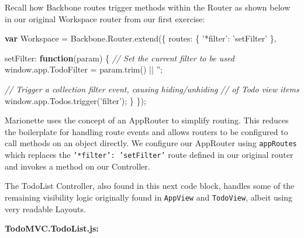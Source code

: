 \documentclass[9pt]{book}
\newenvironment{Shaded}{}{}
\newcommand{\KeywordTok}[1]{\textcolor[rgb]{0.00,0.44,0.13}{\textbf{{#1}}}}
\newcommand{\DataTypeTok}[1]{\textcolor[rgb]{0.56,0.13,0.00}{{#1}}}
\newcommand{\StringTok}[1]{\textcolor[rgb]{0.25,0.44,0.63}{{#1}}}
\newcommand{\CommentTok}[1]{\textcolor[rgb]{0.38,0.63,0.69}{\textit{{#1}}}}
\newcommand{\OtherTok}[1]{\textcolor[rgb]{0.00,0.44,0.13}{{#1}}}
\newcommand{\FunctionTok}[1]{\textcolor[rgb]{0.02,0.16,0.49}{{#1}}}
\newcommand{\NormalTok}[1]{{#1}}
\begin{document}
Recall how Backbone routes trigger methods within the Router as shown
below in our original Workspace router from our first exercise:

\begin{Shaded}
\begin{Highlighting}[]
  \KeywordTok{var} \NormalTok{Workspace = }\OtherTok{Backbone}\NormalTok{.}\OtherTok{Router}\NormalTok{.}\FunctionTok{extend}\NormalTok{(\{}
    \DataTypeTok{routes}\NormalTok{: \{}
      \StringTok{'*filter'}\NormalTok{: }\StringTok{'setFilter'}
    \NormalTok{\},}

    \DataTypeTok{setFilter}\NormalTok{: }\KeywordTok{function}\NormalTok{(param) \{}
      \CommentTok{// Set the current filter to be used}
      \OtherTok{window}\NormalTok{.}\OtherTok{app}\NormalTok{.}\FunctionTok{TodoFilter} \NormalTok{= }\OtherTok{param}\NormalTok{.}\FunctionTok{trim}\NormalTok{() || }\StringTok{''}\NormalTok{;}

      \CommentTok{// Trigger a collection filter event, causing hiding/unhiding}
      \CommentTok{// of Todo view items}
      \OtherTok{window}\NormalTok{.}\OtherTok{app}\NormalTok{.}\OtherTok{Todos}\NormalTok{.}\FunctionTok{trigger}\NormalTok{(}\StringTok{'filter'}\NormalTok{);}
    \NormalTok{\}}
  \NormalTok{\});}
\end{Highlighting}
\end{Shaded}

Marionette uses the concept of an AppRouter to simplify routing. This
reduces the boilerplate for handling route events and allows routers to
be configured to call methods on an object directly. We configure our
AppRouter using \texttt{appRoutes} which replaces the
\texttt{'*filter': 'setFilter'} route defined in our original router and
invokes a method on our Controller.

The TodoList Controller, also found in this next code block, handles
some of the remaining visibility logic originally found in
\texttt{AppView} and \texttt{TodoView}, albeit using very readable
Layouts.

\textbf{TodoMVC.TodoList.js:}
\end{document}
